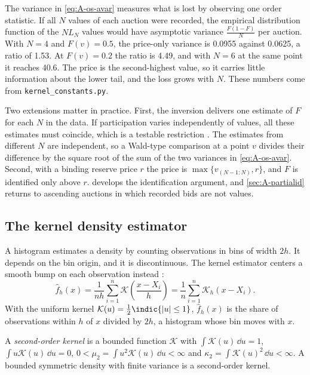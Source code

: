 The variance in \eqref{eq:A-os-avar} measures what is lost by observing one order statistic. If all $N$
values of each auction were recorded, the empirical distribution function of the $NL_N$ values would
have asymptotic variance $\frac{F(1-F)}{N}$ per auction. With $N=4$ and $F(v)=0.5$, the price-only
variance is 0.0955 against 0.0625, a ratio of 1.53. At $F(v)=0.2$ the ratio is 4.49, and with $N=6$ at
the same point it reaches 40.6. The price is the second-highest value, so it carries little information about the lower
tail, and the loss grows with $N$. These numbers come from \texttt{kernel\_constants.py}.

Two extensions matter in practice. First, the inversion delivers one estimate of $F$ for each $N$ in the
data. If participation varies independently of values, all these estimates must coincide, which is a
testable restriction \citep[Theorem~1]{AtheyHaile2002}. The estimates from different $N$ are
independent, so a Wald-type comparison at a point $v$ divides their difference by the square root of the
sum of the two variances in \eqref{eq:A-os-avar}. Second, with a binding reserve price $r$ the price is
$\max\{v_{(N-1:N)},r\}$, and $F$ is identified only above $r$.  develops the
identification argument, and \cref{sec:A-partialid} returns to ascending auctions in which recorded bids
are not values.

\subsection{The kernel density estimator}\label{sec:A-kde-estimator}

A histogram estimates a density by counting observations in bins of width $2h$. It depends on the bin
origin, and it is discontinuous. The kernel estimator centers a smooth bump on each observation
instead \citep{Rosenblatt1956,Parzen1962}:
\begin{equation}\label{eq:A-kde}
\hat f_h(x)=\frac{1}{nh}\sum_{i=1}^{n}\mathcal{K}\!\left(\frac{x-X_i}{h}\right)
=\frac{1}{n}\sum_{i=1}^{n}\mathcal{K}_h(x-X_i).
\end{equation}
With the uniform kernel $\mathcal{K}(u)=\frac{1}{2}\indic\{|u|\le1\}$, $\hat f_h(x)$ is the share of
observations within $h$ of $x$ divided by $2h$, a histogram whose bin moves with $x$.

\begin{definition}\label{def:A-kernel}
A \emph{second-order kernel} is a bounded function $\mathcal{K}$ with $\int\mathcal{K}(u)\,\dd u=1$,
$\int u\mathcal{K}(u)\,\dd u=0$, $0<\mu_2=\int u^2\mathcal{K}(u)\,\dd u<\infty$ and
$\kappa_2=\int\mathcal{K}(u)^2\,\dd u<\infty$. A bounded symmetric density with finite variance is a
second-order kernel.
\end{definition}

